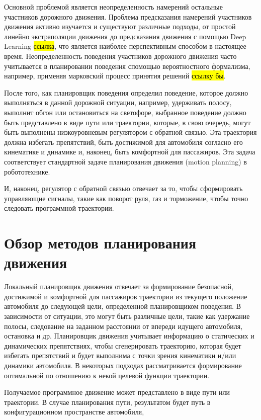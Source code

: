 Основной проблемой является неопределенность намерений остальные участников дорожного движения. Проблема предсказания
намерений участников движения активно изучается и существуют различные подходы, от простой линейно экстраполяции
\cite{darpa_junior_frenet} движения до предсказания движения с помощью Deep Learning \hl{ссылка}, что является наиболее
перспективным способом в настоящее время. Неопределенность поведения участников дорожного движения часто учитывается в
планировании поведения спомощью вероятностного формализма, например, применяя марковский процесс принятия решений
\hl{ссылку бы}.

После того, как планировщик поведения определил поведение, которое должно выполняться в данной дорожной ситуации,
например, удерживать полосу, выполнит обгон или остановиться на светофоре, выбранное поведение должно быть
представлено в виде пути или траектории, которые, в свою очередь, могут быть выполнены низкоуровневым регулятором с
обратной связью. Эта траектория должна избегать препятствий, быть достижимой для автомобиля согласно его кинематике
и динамике и, наконец, быть комфортной для пассажиров. Эта задача соответствует стандартной задаче планирования
движения (motion planning) в робототехнике.

И, наконец, регулятор с обратной связью отвечает за то, чтобы сформировать управляющие сигналы, такие как поворот
руля, газ и торможение, чтобы точно следовать программной траектории.

\section{Обзор методов планирования движения}

Локальный планировщик движения отвечает за формирование безопасной, достижимой и комфортной для пассажиров траектории
из текущего положение автомобиля до следующей цели, определенной планировщиком поведения. В зависимости от ситуации,
это могут быть различные цели, такие как удержание полосы, следование на заданном расстоянии от впереди идущего
автомобиля, остановка и др. Планировщик движения учитывает информацию о статических и динамических препятствиях, чтобы
сгенерировать траекторию, которая будет избегать препятствий и будет выполнима с точки зрения кинематики и/или динамики
автомобиля. В некоторых подходах рассматривается формирование оптимальной по отношению к некой целевой функции
траектории.

Получаемое программное движение может представлено в виде пути или траектории. В случае планирования пути, результатом
будет путь в конфигурационном пространстве автомобиля,

